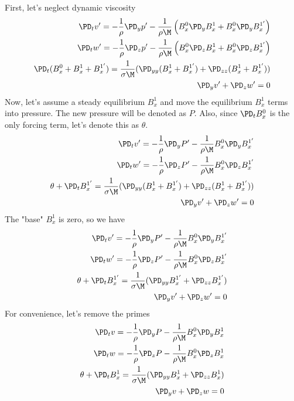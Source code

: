 \documentclass[11pt]{article}
\begin{document}
First, let's neglect dynamic viscosity
\begin{equation}\begin{aligned}
\PD_t v' = -\frac{1}{\rho}\PD_y p' - \frac{1}{\rho \M} \left( B_x^0 \PD_y B_x^1 + B_x^0 \PD_y B_x^{1'} \right) \\
\PD_t w' = -\frac{1}{\rho}\PD_z p' - \frac{1}{\rho \M} \left( B_x^0 \PD_z B_x^1 + B_x^0 \PD_z B_x^{1'} \right) \\
\PD_t (B_x^{0}+B_x^{1}+B_x^{1'}) = \frac{1}{\sigma \M} (\PD_{yy} (B_x^{1}+B_x^{1'})+\PD_{zz} (B_x^{1}+B_x^{1'})) \\
\PD_y v' + \PD_z w' = 0  \\
\end{aligned} \end{equation}
Now, let's assume a steady equilibrium $B_x^1$ and move the equilibrium $B_x^1$ terms into pressure. The new pressure will be denoted as $P$. Also, since $\PD_t B_x^0$ is the only forcing term, let's denote this as $\theta$.
\begin{equation}\begin{aligned}
\PD_t v' = -\frac{1}{\rho}\PD_y P' - \frac{1}{\rho \M} B_x^0 \PD_y B_x^{1'} \\
\PD_t w' = -\frac{1}{\rho}\PD_z P' - \frac{1}{\rho \M} B_x^0 \PD_z B_x^{1'} \\
\theta + \PD_t B_x^{1'} = \frac{1}{\sigma \M} (\PD_{yy} (B_x^{1}+B_x^{1'})+\PD_{zz} (B_x^{1}+B_x^{1'})) \\
\PD_y v' + \PD_z w' = 0  \\
\end{aligned} \end{equation}
The "base" $B_x^1$ is zero, so we have
\begin{equation}\begin{aligned}
\PD_t v' = -\frac{1}{\rho}\PD_y P' - \frac{1}{\rho \M} B_x^0 \PD_y B_x^{1'} \\
\PD_t w' = -\frac{1}{\rho}\PD_z P' - \frac{1}{\rho \M} B_x^0 \PD_z B_x^{1'} \\
\theta + \PD_t B_x^{1'} = \frac{1}{\sigma \M} (\PD_{yy} B_x^{1'}+\PD_{zz} B_x^{1'}) \\
\PD_y v' + \PD_z w' = 0  \\
\end{aligned} \end{equation}
For convenience, let's remove the primes
\begin{equation}\begin{aligned}
\PD_t v = -\frac{1}{\rho}\PD_y P - \frac{1}{\rho \M} B_x^0 \PD_y B_x^{1} \\
\PD_t w = -\frac{1}{\rho}\PD_z P - \frac{1}{\rho \M} B_x^0 \PD_z B_x^{1} \\
\theta + \PD_t B_x^{1} = \frac{1}{\sigma \M} (\PD_{yy} B_x^{1}+\PD_{zz} B_x^{1}) \\
\PD_y v + \PD_z w = 0  \\
\end{aligned} \end{equation}
\end{document}
